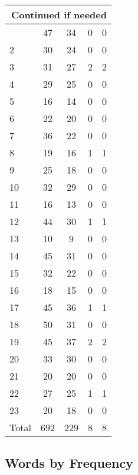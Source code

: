 \begin{center}
\begin{longtable}{l|c|c|c|c}
\hline \multicolumn{5}{|r|}{{Continued if needed}} \\ \hline
\endfoot 
1 & 47 & 34 & 0 & 0\\ \hline
2 & 30 & 24 & 0 & 0\\ \hline
3 & 31 & 27 & 2 & 2\\ \hline
4 & 29 & 25 & 0 & 0\\ \hline
5 & 16 & 14 & 0 & 0\\ \hline
6 & 22 & 20 & 0 & 0\\ \hline
7 & 36 & 22 & 0 & 0\\ \hline
8 & 19 & 16 & 1 & 1\\ \hline
9 & 25 & 18 & 0 & 0\\ \hline
10 & 32 & 29 & 0 & 0\\ \hline
11 & 16 & 13 & 0 & 0\\ \hline
12 & 44 & 30 & 1 & 1\\ \hline
13 & 10 & 9 & 0 & 0\\ \hline
14 & 45 & 31 & 0 & 0\\ \hline
15 & 32 & 22 & 0 & 0\\ \hline
16 & 18 & 15 & 0 & 0\\ \hline
17 & 45 & 36 & 1 & 1\\ \hline
18 & 50 & 31 & 0 & 0\\ \hline
19 & 45 & 37 & 2 & 2\\ \hline
20 & 33 & 30 & 0 & 0\\ \hline
21 & 20 & 20 & 0 & 0\\ \hline
22 & 27 & 25 & 1 & 1\\ \hline
23 & 20 & 18 & 0 & 0\\ \hline
\hline \hline
Total & 692 & 229 & 8 & 8



\end{longtable}
\end{center}

 
\subsection{Words by Frequency}

